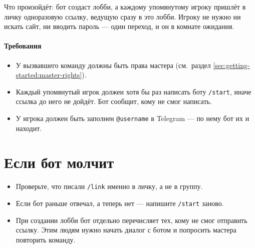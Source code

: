 Что произойдёт: бот создаст лобби, а каждому упомянутому игроку пришлёт в личку одноразовую ссылку, ведущую сразу в это лобби. Игроку не нужно ни искать сайт, ни вводить пароль --- один переход, и он в комнате ожидания.

\paragraph{Требования}
\begin{itemize}
\item У вызвавшего команду должны быть права мастера (см.\ раздел \ref{sec:getting-started:master-rights}).
\item Каждый упомянутый игрок должен хотя бы раз написать боту \texttt{/start}, иначе ссылка до него не дойдёт. Бот сообщит, кому не смог написать.
\item У игрока должен быть заполнен \texttt{@username} в Telegram --- по нему бот их и находит.
\end{itemize}

\section{Если бот молчит}
\label{sec:telegram:silent}

\begin{itemize}
\item Проверьте, что писали \texttt{/link} именно в личку, а не в группу.
\item Если бот раньше отвечал, а теперь нет --- напишите \texttt{/start} заново.
\item При создании лобби бот отдельно перечисляет тех, кому не смог отправить ссылку. Этим людям нужно начать диалог с ботом и попросить мастера повторить команду.
\end{itemize}
